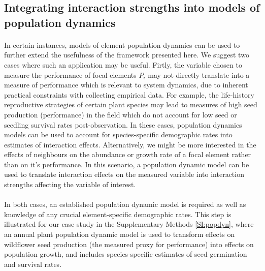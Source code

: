 \documentclass[a4,12pt]{article}
\begin{document}
    \subsection{Integrating interaction strengths into models of population dynamics}

        \paragraph{}
        In certain instances, models of element population dynamics can be used to further extend the usefulness of the framework presented here. We suggest two cases where such an application may be useful. Firtly, the variable chosen to measure the performance of focal elements $P_i$ may not directly translate into a measure of performance which is relevant to system dynamics,  due to inherent practical constraints with collecting empirical data. For example, the life-history reproductive strategies of certain plant species may lead to measures of high seed production (performance) in the field which do not account for low seed or seedling survival rates post-observation. In these cases, population dynamics models can be used to account for species-specific demographic rates into estimates of interaction effects. Alternatively, we might be more interested in the effects of neighbours on the abundance or growth rate of a focal element rather than on it's performance. In this scenario, a population dynamic model can be used to translate interaction effects on the measured variable into interaction strengths affecting the variable of interest. 

        \paragraph{}
        In both cases, an established population dynamic model is required as well as knowledge of any crucial element-specific demographic rates. This step is illustrated for our case study in the Supplementary Methods \ref{SI:popdyn}, where an annual plant population dynamic model is used to transform effects on wildflower seed production (the measured proxy for performance) into effects on population growth, and includes species-specific estimates of seed germination and survival rates. 

\end{document}
